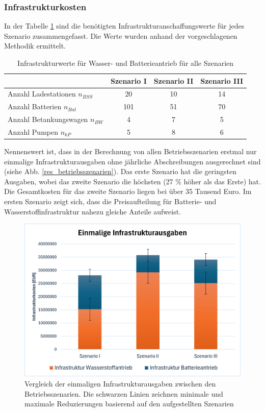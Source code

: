 \subsubsection{Infrastrukturkosten}
In der Tabelle \ref{Infrastrukturwerte_res} sind die benötigten 
Infrastrukturanschaffungswerte für jedes Szenario zusammengefasst. 
Die Werte wurden anhand der vorgeschlagenen Methodik ermittelt.\\
%
\begin{table}[h]
	\begin{center}
    \caption{Infrastrukturwerte für Wasser- und Batterieantrieb für alle Szenarien}
	\label{Infrastrukturwerte_res}
	\begin{tabular}{|l|c|c|c|}
		\hline
		 & \textbf{Szenario I}& \textbf{Szenario II}& \textbf{Szenario III} \\ \hline
		Anzahl Ladestationen $n_{BSS}$ & 20 & 10& 14\\ \hline
		Anzahl Batterien $n_{Bat}$ & 101 & 51& 70 \\ \hline
		Anzahl Betankungswagen $n_{BW}$ & 4 & 7 & 5\\ \hline
		Anzahl Pumpen $n_{kP}$  & 5 & 8 & 6\\ \hline
	\end{tabular}
    \end{center}
\end{table}
%
Nennenswert ist, dass in der Berechnung von allen Betriebsszenarien erstmal nur einmalige Infrastrukturausgaben 
ohne jährliche Abschreibungen ausgerechnet sind (siehe Abb. \ref{res_betriebsszenarien}). 
Das erste Szenario hat die geringsten Ausgaben, wobei das zweite Szenario die höchsten (27 \% höher als das Erste) hat.
Die Gesamtkosten für das zweite Szenario liegen bei über 35 Tausend Euro. %
Im ersten Szenario zeigt sich, dass die Preisaufteilung für Batterie- und Wasserstoffinfrastruktur nahezu gleiche Anteile aufweist.\\
\begin{figure}[h]
	\centering
	\includegraphics[width=0.8\linewidth]{Bilder/Infr_Szenarien.png}
	\caption[Vergleich der einmaligen Infrastrukturausgaben zwischen den Betriebsszenarien]{Vergleich der einmaligen Infrastrukturausgaben zwischen den Betriebsszenarien. Die schwarzen Linien
	zeichnen minimale und maximale Reduzierungen basierend auf den aufgestellten Szenarien}
	\label{res_infr_betriebsszenarien}
\end{figure}
